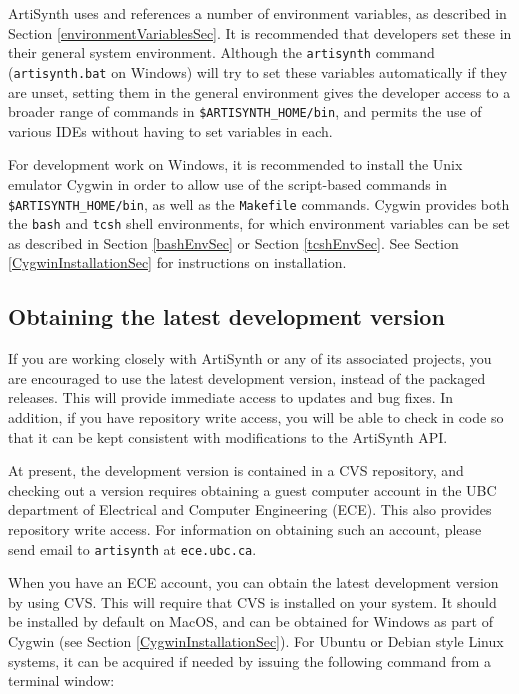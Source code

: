 \documentclass{article}
\begin{document}
ArtiSynth uses and references a number of environment variables, as
described in Section \ref{environmentVariablesSec}. It is recommended that
developers set these in their general system environment.  Although
the {\tt artisynth} command ({\tt artisynth.bat} on Windows) will try to set
these variables automatically if they are unset, setting them in the
general environment gives the developer access to a broader range of
commands in {\tt \$ARTISYNTH\_HOME/bin}, and permits the use of various IDEs
without having to set variables in each.

For development work on Windows, it is recommended to install the Unix
emulator Cygwin in order to allow use of the script-based commands in
{\tt \$ARTISYNTH\_HOME/bin}, as well as the {\tt Makefile} commands.  Cygwin
provides both the {\tt bash} and {\tt tcsh} shell environments, for which
environment variables can be set as described in Section \ref{bashEnvSec} or
Section \ref{tcshEnvSec}.  See Section \ref{CygwinInstallationSec} for instructions on
installation.

\subsection{Obtaining the latest development version}
\label{obtainingDevelopmentVersionSec}

If you are working closely with ArtiSynth or any of its associated
projects, you are encouraged to use the latest development version,
instead of the packaged releases. This will provide immediate access
to updates and bug fixes. In addition, if you have repository write
access, you will be able to check in code so that it can be kept
consistent with modifications to the ArtiSynth API.

At present, the development version is contained in a CVS repository,
and checking out a version requires obtaining a guest computer account
in the UBC department of Electrical and Computer Engineering
(ECE). This also provides repository write access. For information on
obtaining such an account, please send email to {\tt artisynth} at
{\tt ece.ubc.ca}.

When you have an ECE account, you can obtain the latest development
version by using CVS. This will require that CVS is installed on your
system. It should be installed by default on MacOS, and can be
obtained for Windows as part of Cygwin (see Section \ref{CygwinInstallationSec}).  For Ubuntu
or Debian style Linux systems, it can be acquired if needed by issuing
the following command from a terminal window:
\end{document}
